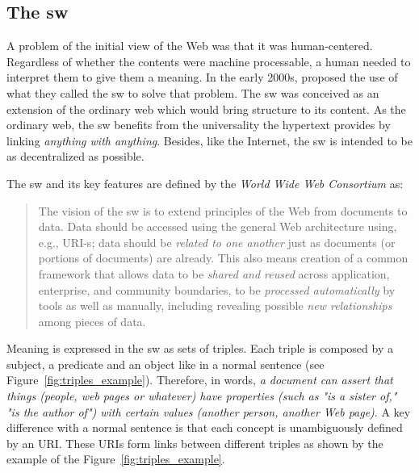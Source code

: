 \subsection{The \acl{sw}}
\label{sec:semantic_web}

A problem of the initial view of the Web was that it was human-centered.
Regardless of whether the contents were machine processable, a human needed to interpret them to give them a meaning.
In the early 2000s, \citet{berners-lee_semantic_2001} proposed the use of what they called the \acf{sw} to solve that problem.
The \ac{sw} was conceived as an extension of the ordinary web which would bring structure to its content.
As the ordinary web, the \ac{sw} benefits from the universality the hypertext provides by linking \emph{anything with anything}.
Besides, like the Internet, the \ac{sw} is intended to be as decentralized as possible.

The \acl{sw} and its key features are defined by the \emph{World Wide Web Consortium} \citep{semanticWeb-FAQ} as:
\begin{quote}
The vision of the \acl{sw} is to extend principles of the Web from documents to data.
Data should be accessed using the general Web architecture using, e.g., URI-s;
data should be \emph{related to one another} just as documents (or portions of documents) are already.
This also means creation of a common framework that allows data to be \emph{shared and reused} across application, enterprise, and community boundaries,
to be \emph{processed automatically} by tools as well as manually, including revealing possible \emph{new relationships} among pieces of data.
\end{quote}

Meaning is expressed in the \acl{sw} as sets of triples.
Each triple is composed by a subject, a predicate and an object like in a normal sentence (see Figure~\ref{fig:triples_example}).
Therefore, in  \citeauthor{berners-lee_semantic_2001} words, \emph{a document can assert that things (people, web pages or whatever) have properties (such as "is a sister of," "is the author of") with certain values (another person, another Web page)}.
A key difference with a normal sentence is that each concept is unambiguously defined by an URI.
These URIs form links between different triples as shown by the example of the Figure~\ref{fig:triples_example}.



